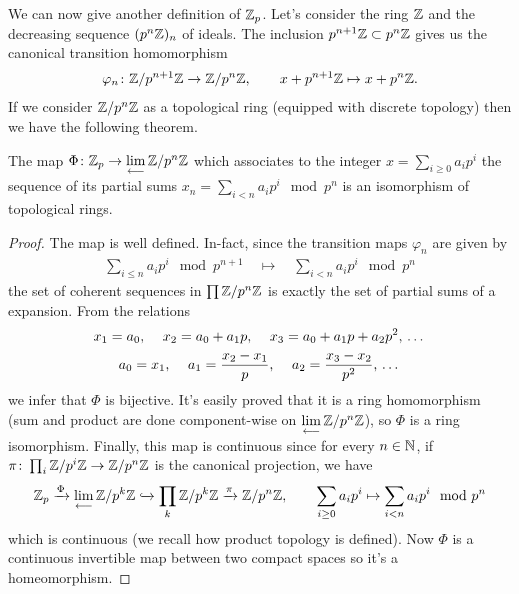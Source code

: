 		We can now give another definition of $\mathbb{Z}_p$. Let's consider the ring $\mathbb{Z}$ and the decreasing sequence $(p^n\mathbb{Z})_n$ of ideals. The inclusion $p^{n+1}\mathbb{Z} \subset p^n\mathbb{Z}$ gives us the canonical transition homomorphism
		\begin{gather*}
			\varphi_n\colon \mathbb{Z}/p^{n+1}\mathbb{Z} \to \mathbb{Z}/p^n\mathbb{Z}, \qquad x + p^{n+1}\mathbb{Z} \mapsto x + p^n\mathbb{Z}.
		\end{gather*}
		If we consider $\mathbb{Z}/p^n\mathbb{Z}$ as a topological ring (equipped with discrete topology) then we have the following theorem.
		\begin{thm}
			\label{thm:projective-lim}
			The map $\Phi\colon \mathbb{Z}_p \to \lim\limits_{\longleftarrow}\mathbb{Z}/p^n\mathbb{Z}$ which associates to the \padic integer $x = \sum_{i \geq 0} a_ip^i$ the sequence of its partial sums $x_n = \sum_{i < n}a_ip^i \mod p^n$ is an isomorphism of topological rings.
		\end{thm}
		\begin{proof}
			The map is well defined. In-fact, since the transition maps $\varphi_n$ are given by
			\begin{gather*}
				\sum_{i \leq n}a_ip^i \mod p^{n+1} \quad \mapsto \quad \sum_{i < n}a_ip^i \mod p^n
			\end{gather*}
			the set of coherent sequences in $\prod \mathbb{Z}/p^n\mathbb{Z}$ is exactly the set of partial sums of a \padic expansion. From the relations
			\begin{gather*}
				x_1 = a_0 \text{, } \quad x_2 = a_0 + a_1p \text{, } \quad x_3 = a_0 + a_1p + a_2p^2 \text{, \dots} \\
				a_0 = x_1 \text{, } \quad a_1 = \frac{x_2 - x_1}{p} \text{, } \quad a_2 = \frac{x_3 - x_2}{p^2} \text{, \dots}
			\end{gather*}
			we infer that $\Phi$ is bijective. It's easily proved that it is a ring homomorphism (sum and product are done component-wise on $\lim\limits_{\longleftarrow}\mathbb{Z}/p^n\mathbb{Z}$), so $\Phi$ is a ring isomorphism. Finally, this map is continuous since for every $n \in \mathbb{N}$, if $\pi\colon \prod_i \mathbb{Z}/p^i\mathbb{Z} \to \mathbb{Z}/p^n\mathbb{Z}$ is the canonical projection, we have
			\begin{gather*}
				\begin{aligned}
					\mathbb{Z}_p \xrightarrow{\Phi} \lim\limits_{\longleftarrow}\mathbb{Z}/p^k\mathbb{Z} \xhookrightarrow{} \prod_k \mathbb{Z}/p^k\mathbb{Z} \xrightarrow{\pi} \mathbb{Z}/p^n\mathbb{Z}, \qquad
					\sum_{i \geq 0}a_ip^i \mapsto \sum_{i < n} a_ip^i \mod p^n
				\end{aligned}
			\end{gather*}
			which is continuous (we recall how product topology is defined). Now $\Phi$ is a continuous invertible map between two compact spaces so it's a homeomorphism.
		\end{proof}

